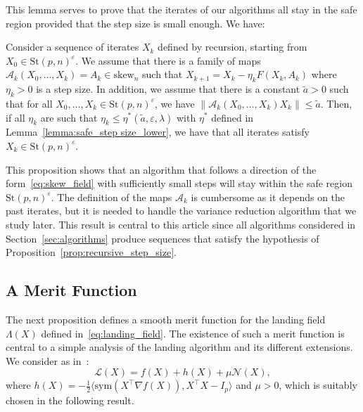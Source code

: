 \documentclass[twoside,11pt]{article}
\newcommand{\stiefel}{{\mathrm{St}(p, n)}}
\newcommand{\sk}{{\mathrm{skew}}}
\newcommand{\sym}{{\mathrm{sym}}}
\begin{document}
%
%
%
%
%

This lemma serves to prove that the iterates of our algorithms all stay in the safe region provided that the step size is small enough. We have:
\begin{proposition}
\label{prop:recursive_step_size}
    Consider a sequence of iterates $X_k$ defined by recursion, starting from $X_0\in \stiefel^\varepsilon$. We assume that there is a family of maps $\mathcal{A}_k(X_0, \dots, X_k) = A_k\in\sk_n$ such that $X_{k+1} = X_k-\eta_kF(X_k, A_k)$ where $\eta_k > 0$ is a step size. In addition, we assume that there is a constant $\tilde{a}>0$ such that for all $X_0, \dots, X_k \in \stiefel^\varepsilon$, we have $\|\mathcal{A}_k(X_0, \dots, X_k)X_k\|\leq \tilde{a}$. Then, if all $\eta_k$ are such that $\eta_k\leq \eta^*(\tilde{a}, \varepsilon, \lambda)$ with $\eta^*$
    defined in Lemma~\ref{lemma:safe_step size_lower}, we have that all iterates satisfy 
    $X_k\in\stiefel^\varepsilon$.
\end{proposition}
This proposition shows that an algorithm that follows a direction of the form~\eqref{eq:skew_field} with sufficiently small steps will stay within the safe region $\stiefel^\varepsilon$.
The definition of the maps $\mathcal{A}_k$ is cumbersome as it depends
on the past iterates, but it is needed to handle the variance reduction algorithm that we study later. 
This result is central to this article since all algorithms considered in Section~\ref{sec:algorithms} produce sequences that satisfy the hypothesis of Proposition~\ref{prop:recursive_step_size}.

\subsection{A Merit Function}
\label{sec:merit}
The next proposition defines a smooth merit function for the landing 
%
field $\Lambda(X)$ defined in~\eqref{eq:landing_field}. The existence of such a merit function is central to a simple analysis of the landing algorithm and its different extensions. 
We consider as in~\citep{gao2019parallelizable}:
\begin{equation} \label{eq:merit_function}
    \mathcal{L}(X) = f(X) + h(X) + \mu \mathcal{N}(X),
\end{equation}
where 
$h(X) = -\frac12\langle \sym(X^\top \nabla f(X)), X^\top X - I_p\rangle$ and $\mu>0$, which is suitably chosen in the following result.

%

%
%
%
%
%
%
%
%
%
%
%
%
\end{document}
